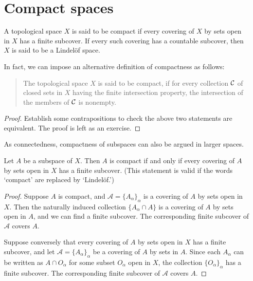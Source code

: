 \section{Compact spaces}

\begin{defi}
    A topological space $X$ is said to be compact if every covering of $X$ by sets open in $X$ has a finite subcover.
    If every such covering has a countable subcover, then $X$ is said to be a Lindel\"{o}f space.
\end{defi}
\begin{rmk}
    In fact, we can impose an alternative definition of compactness as follows:
    \begin{quotation}
        The topological space $X$ is said to be compact, if for every collection ${\mathcal{C}}$ of closed sets in $X$ having the finite intersection property, the intersection of the members of ${\mathcal{C}}$ is nonempty. 
    \end{quotation}
\end{rmk}
\begin{proof}
    Establish some contrapositions to check the above two statements are equivalent.
    The proof is left as an exercise.
\end{proof}

As connectedness, compactness of subspaces can also be argued in larger spaces.
\begin{thm}
    Let $A$ be a subspace of $X$.
    Then $A$ is compact if and only if every covering of $A$ by sets open in $X$ has a finite subcover.
    (This statement is valid if the words `compact' are replaced by `Lindel\"{o}f.')
\end{thm}
\begin{proof}
    Suppose $A$ is compact, and $\mathcal{A}=\{A_\alpha\}_\alpha$ is a covering of $A$ by sets open in $X$.
    Then the naturally induced collection $\{A_\alpha\cap A\}$ is a covering of $A$ by sets open in $A$, and we can find a finite subcover.
    The corresponding finite subcover of $\mathcal{A}$ covers $A$.

    Suppose conversely that every covering of $A$ by sets open in $X$ has a finite subcover, and let $\mathcal{A}=\{A_\alpha\}_\alpha$ be a covering of $A$ by sets in $A$.
    Since each $A_\alpha$ can be written as $A\cap O_\alpha$ for some subset $O_\alpha$ open in $X$, the collection $\{O_\alpha\}_\alpha$ has a finite subcover.
    The corresponding finite subcover of $\mathcal{A}$ covers $A$.
\end{proof}

